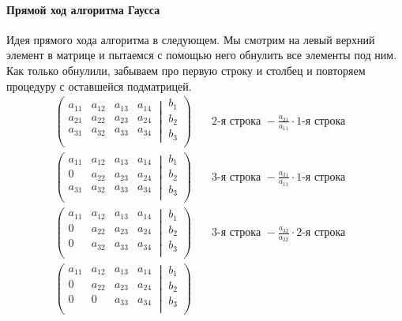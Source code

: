 \paragraph{Прямой ход алгоритма Гаусса}

Идея прямого хода алгоритма в следующем.
Мы смотрим на левый верхний элемент в матрице и пытаемся с помощью него обнулить все элементы под ним.
Как только обнулили, забываем про первую строку и столбец и повторяем процедуру с оставшейся подматрицей.
\begin{align*}
\left(\left.
\begin{matrix}
a_{11}& a_{12}&a_{13}& a_{14}\\
a_{21}& a_{22}&a_{23}& a_{24}\\
a_{31}& a_{32}&a_{33}& a_{34}\\
\end{matrix}
\:\right|\:
\begin{matrix}
b_1\\
b_2\\
b_3\\
\end{matrix}
\right)&
\quad 2\text{-я строка }-\frac{a_{21}}{a_{11}}\cdot1\text{-я строка}\quad\\
\left(\left.
\begin{matrix}
a_{11}& a_{12}&a_{13}& a_{14}\\
0& a_{22}&a_{23}& a_{24}\\
a_{31}& a_{32}&a_{33}& a_{34}\\
\end{matrix}
\:\right|\:
\begin{matrix}
b_1\\
b_2\\
b_3\\
\end{matrix}
\right)&
\quad 3\text{-я строка }-\frac{a_{31}}{a_{11}}\cdot1\text{-я строка}\quad\\
\left(\left.
\begin{matrix}
a_{11}& a_{12}&a_{13}& a_{14}\\
0& a_{22}&a_{23}& a_{24}\\
0& a_{32}&a_{33}& a_{34}\\
\end{matrix}
\:\right|\:
\begin{matrix}
b_1\\
b_2\\
b_3\\
\end{matrix}
\right)&
\quad 3\text{-я строка }-\frac{a_{32}}{a_{22}}\cdot2\text{-я строка}\quad\\
\left(\left.
\begin{matrix}
a_{11}& a_{12}&a_{13}& a_{14}\\
0& a_{22}&a_{23}& a_{24}\\
0& 0&a_{33}& a_{34}\\
\end{matrix}
\:\right|\:
\begin{matrix}
b_1\\
b_2\\
b_3\\
\end{matrix}
\right)&
\end{align*}

